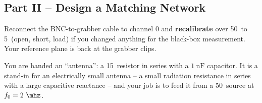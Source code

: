 \documentclass{exam}
\def\antR{15}			%
\def\antC{1}			%
\def\fdes{2}			%
\begin{document}
\begin{questions}


\newpage
\section{Part II -- Design a Matching Network}

Reconnect the BNC-to-grabber cable to channel 0 and \textbf{recalibrate} over
50\khz\ to 5\mhz\ (open, short, load) if you changed anything for the black-box
measurement. Your reference plane is back at the grabber clips.


You are handed an ``antenna'': a \antR\ohms\ resistor in series with a
$\antC\ \text{nF}$ capacitor. It is a stand-in for an electrically small
antenna -- a small radiation resistance in series with a large capacitive
reactance -- and your job is to feed it from a 50\ohms\ source at
$f_0 = \fdes\ \mhz$.


\end{questions}
\end{document}
